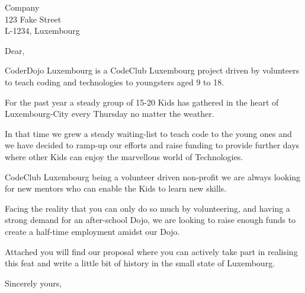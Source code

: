 \documentclass[DIN, pagenumber=false, parskip=half,%
               fromalign=right, 
               fromrule=false,fromlogo]{scrlttr2}
\begin{document}
 
\begin{letter}{ Company \\ 123 Fake Street \\ L-1234, Luxembourg}


\opening{Dear,}

CoderDojo Luxembourg is a CodeClub Luxembourg project driven by volunteers to teach coding and technologies to youngsters aged 9 to 18.

For the past year a steady group of 15-20 Kids has gathered in the heart of Luxembourg-City every Thursday no matter the weather.

In that time we grew a steady waiting-list to teach code to the young ones and we have decided to ramp-up our efforts and raise funding to provide further days where other Kids can enjoy the marvellous world of Technologies.

CodeClub Luxembourg being a volunteer driven non-profit we are always looking for new mentors who can enable the Kids to learn new skills.

Facing the reality that you can only do so much by volunteering, and having a strong demand for an after-school Dojo, we are looking to raise enough funds to create a half-time employment amidst our Dojo.

Attached you will find our proposal where you can actively take part in realising this feat and write a little bit of history in the small state of Luxembourg.

\closing{Sincerely yours,}




\end{letter}
 
\end{document}
